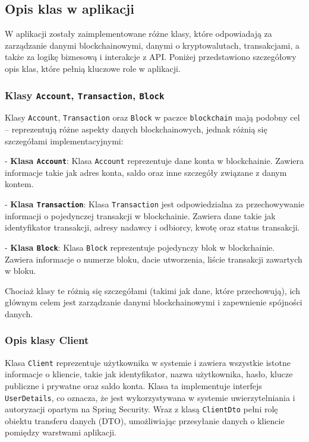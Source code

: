 \subsection{Opis klas w aplikacji}

W aplikacji zostały zaimplementowane różne klasy, które odpowiadają za zarządzanie danymi blockchainowymi, danymi o kryptowalutach, transakcjami, a także za logikę biznesową i interakcje z API. Poniżej przedstawiono szczegółowy opis klas, które pełnią kluczowe role w aplikacji.

\subsubsection{Klasy \texttt{Account}, \texttt{Transaction}, \texttt{Block}}

Klasy \texttt{Account}, \texttt{Transaction} oraz \texttt{Block} w paczce \texttt{blockchain} mają podobny cel – reprezentują różne aspekty danych blockchainowych, jednak różnią się szczegółami implementacyjnymi:

- \textbf{Klasa \texttt{Account}}: 
  Klasa \texttt{Account} reprezentuje dane konta w blockchainie. Zawiera informacje takie jak adres konta, saldo oraz inne szczegóły związane z danym kontem. 

- \textbf{Klasa \texttt{Transaction}}: 
  Klasa \texttt{Transaction} jest odpowiedzialna za przechowywanie informacji o pojedynczej transakcji w blockchainie. Zawiera dane takie jak identyfikator transakcji, adresy nadawcy i odbiorcy, kwotę oraz status transakcji.
	
- \textbf{Klasa \texttt{Block}}: 
  Klasa \texttt{Block} reprezentuje pojedynczy blok w blockchainie. Zawiera informacje o numerze bloku, dacie utworzenia, liście transakcji zawartych w bloku. 

Chociaż klasy te różnią się szczegółami (takimi jak dane, które przechowują), ich głównym celem jest zarządzanie danymi blockchainowymi i zapewnienie spójności danych.

\subsubsection{Opis klasy Client}

Klasa \texttt{Client} reprezentuje użytkownika w systemie i zawiera wszystkie istotne informacje o kliencie, takie jak identyfikator, nazwa użytkownika, hasło, klucze publiczne i prywatne oraz saldo konta. Klasa ta implementuje interfejs \texttt{UserDetails}, co oznacza, że jest wykorzystywana w systemie uwierzytelniania i autoryzacji opartym na Spring Security. Wraz z klasą \texttt{ClientDto} pełni rolę obiektu transferu danych (DTO), umożliwiając przesyłanie danych o kliencie pomiędzy warstwami aplikacji.

